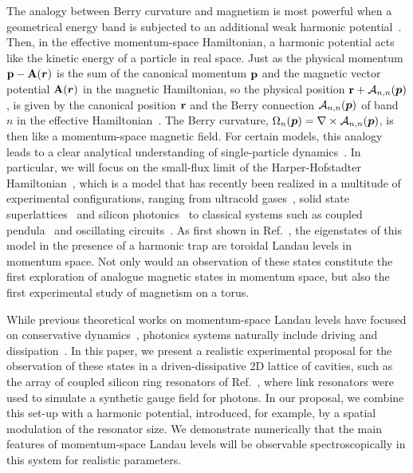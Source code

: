 The analogy between Berry curvature and magnetism is most powerful when a geometrical energy band is subjected to an additional weak harmonic potential~\cite{price2014magnetic}. Then, in the effective momentum-space Hamiltonian, a harmonic potential acts like the kinetic energy of a particle in real space. Just as the physical momentum $\mathbf{p}-\mathbf{A}(\bm{r})$ is the sum of the canonical momentum $\mathbf{p}$ and the magnetic vector potential $\mathbf{A} (\bm{r})$ in the magnetic Hamiltonian, so the physical position $\mathbf{r}+\mathcal{A}_{n,n}(\bm{p})$, is given by the canonical position $\mathbf{r}$ and the Berry connection $\mathcal{A}_{n,n}(\bm{p})$ of band $n$ in the effective Hamiltonian~\cite{adams1959energy,nagaosa, murakami2003dissipationless, bliokh2005spin, fujita, bliokh2005topological,gosselin2006semiclassical}. The Berry curvature, $\Omega_n (\bm{p})= \nabla \times \mathcal{A}_{n,n}(\bm{p})$, is then like a momentum-space magnetic field. For certain models, this analogy leads to a clear analytical understanding of single-particle dynamics~\cite{price2014magnetic, ozawa2014momhh, price2015sporbit, Claassen_prl_2015}. In particular, we will focus on the small-flux limit of the Harper-Hofstadter Hamiltonian~\cite{harper1955magnetic,hofstadter1976butterfly}, which is a model that has recently been realized in a multitude of experimental configurations,
ranging from ultracold
gases~\cite{aidelsburger2013hh,miyake2013hh,mancini2015edge,stuhl2015edge},
solid state superlattices~\cite{dean2013hofstadter,yu2014hierarchy}
and silicon photonics~\cite{hafezi2013imaging} to classical systems
such as coupled pendula~\cite{susstrunk2015pendula} and oscillating
circuits~\cite{jia2013circuits}. As first shown in Ref.~\cite{price2014magnetic}, the eigenstates of this model in the presence of a harmonic trap are toroidal Landau levels in momentum space. Not only would an observation of these states constitute the first exploration of analogue magnetic states in momentum space, but also the first experimental study of magnetism on a torus.  
 
While previous theoretical works on momentum-space Landau levels have focused on conservative dynamics~\cite{price2014magnetic, Claassen_prl_2015}, photonics systems naturally include driving and dissipation~\cite{carusotto2013fluids}. In this paper, we present a realistic experimental proposal for the observation of these states in a driven-dissipative 2D lattice of cavities, such as the array of coupled silicon ring resonators of Ref.~\cite{hafezi2013imaging}, where link resonators were used to simulate a synthetic gauge field for photons. In our proposal, we combine this set-up with a harmonic potential, introduced, for example, by a spatial modulation of the resonator size. We demonstrate numerically that the main features of momentum-space Landau levels will be observable spectroscopically in this system for realistic parameters. 

